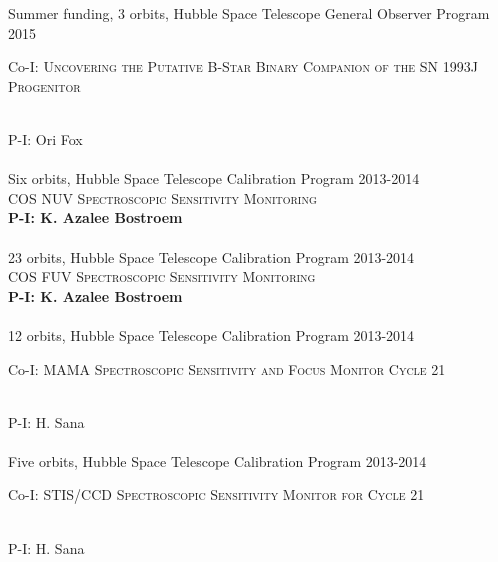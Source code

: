 \documentclass[10pt]{cv}
\begin{document}
\begin{llist}
Summer funding, 3 orbits, Hubble Space Telescope General Observer Program \hfill 2015\\ %
\begin{minipage}[l]{0.7\textwidth}\vspace{0.15cm}
Co-I: \textsc{Uncovering the Putative B-Star Binary Companion of the SN 1993J Progenitor}
\end{minipage}\vspace{0.15cm}\\
P-I: Ori Fox \\
\\
Six orbits, Hubble Space Telescope Calibration Program \hfill 2013-2014\\ %
\textsc{COS NUV Spectroscopic Sensitivity Monitoring}\\
{\bf P-I: K. Azalee Bostroem} \\ %
\\
23 orbits, Hubble Space Telescope Calibration Program \hfill 2013-2014\\ %
\textsc{COS FUV Spectroscopic Sensitivity Monitoring}\\
{\bf P-I: K. Azalee Bostroem} \\ %
\\
12 orbits, Hubble Space Telescope Calibration Program \hfill  2013-2014\\ %
\begin{minipage}[l]{0.7\textwidth}\vspace{0.15cm}
Co-I: \textsc{MAMA Spectroscopic Sensitivity and Focus Monitor Cycle 21}
\end{minipage}\vspace{0.15cm}\\ 
P-I: H. Sana \\ %
\\
Five orbits, Hubble Space Telescope Calibration Program \hfill  2013-2014\\ %
\begin{minipage}[l]{0.7\textwidth}\vspace{0.15cm}
Co-I: \textsc{STIS/CCD Spectroscopic Sensitivity Monitor for Cycle 21} 
\end{minipage}\vspace{0.15cm}\\
P-I: H. Sana\\ %
\\

\end{llist}
\end{document}
